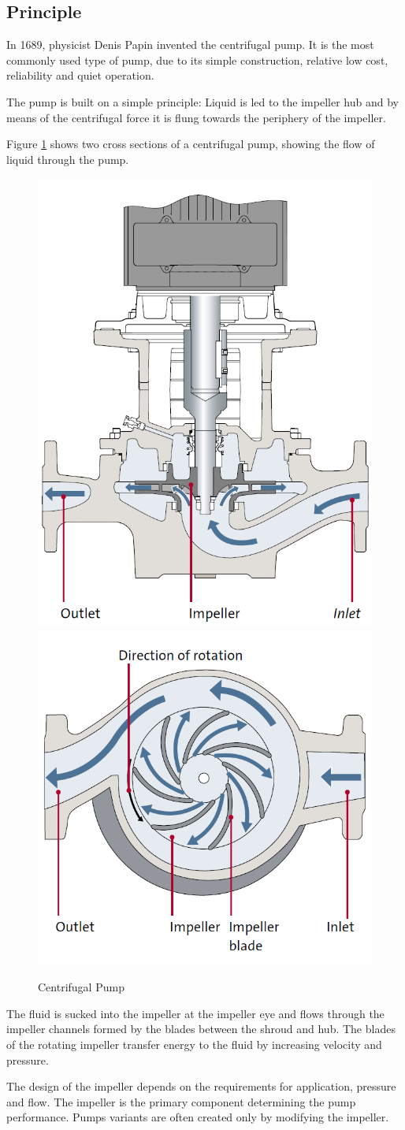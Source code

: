 \subsection{Principle}
In 1689, physicist Denis Papin invented the centrifugal pump. 
It is the most commonly used type of pump, due to its simple construction,
relative low cost, reliability and quiet operation.

The pump is built on a simple principle: Liquid is led to the impeller hub
and by means of the centrifugal force it is flung towards the periphery of 
the impeller. 

Figure \ref{fig:pump_sections} shows two cross sections of a centrifugal pump,
showing the flow of liquid through the pump.
\begin{figure}[h]
    \centering
    \includegraphics[width=0.3\linewidth]{figures/pump_cross_section.PNG}
    \qquad
    \hspace{0.1\textwidth}
    \includegraphics[width=0.3\linewidth]{figures/pump_above_view.PNG}
    \caption{Centrifugal Pump}
    \label{fig:pump_sections}
\end{figure}
\newpage

The fluid is sucked into the impeller at the impeller eye and flows through
the impeller channels formed by the blades between the shroud and hub.
The blades of the rotating impeller transfer energy to the fluid by
increasing velocity and pressure.

The design of the impeller depends on the requirements for application,
pressure and flow. The impeller is the primary component determining the pump performance. 
Pumps variants are often created only by modifying the impeller.


